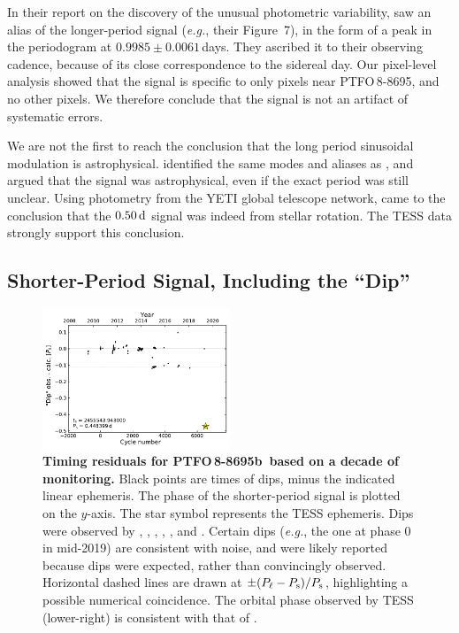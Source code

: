 \documentclass[12pt,twocolumn,tighten]{aastex62}
\newcommand{\ptfo}{PTFO$\,$8-8695}
\newcommand{\ptfob}{PTFO$\,$8-8695b}
\begin{document}
In their report on the discovery of the unusual photometric
variability, \citet{van_eyken_ptf_2012} saw an alias of the
longer-period signal ({\it e.g.}, their Figure~7), in the form of a
peak in the periodogram at $0.9985 \pm 0.0061\,$days. They ascribed it
to their observing cadence, because of its close correspondence to the
sidereal day.  Our pixel-level analysis showed that the signal is
specific to only pixels near \ptfo, and no other pixels.  We therefore
conclude that the signal is not an artifact of systematic errors.

We are not the first to reach the conclusion that the long period
sinusoidal modulation is astrophysical.  \citet{koen_multicolour_2015}
identified the same modes and aliases as \citet{van_eyken_ptf_2012},
and argued that the signal was astrophysical, even if the exact period
was still unclear.  Using photometry from the YETI global telescope
network, \citet{raetz_yeti_2016} came to the conclusion that the
$0.50\,{\rm d}$ signal was indeed from stellar rotation.  The TESS
data strongly support this conclusion.



\subsection{Shorter-Period Signal, Including the ``Dip''}

\begin{figure}[t]
	\begin{center}
		\leavevmode
		\includegraphics[width=0.5\textwidth]{f6.pdf}
	\end{center}
	\vspace{-0.7cm}
	\caption{
    {\bf Timing residuals for \ptfob\ based on a decade of
    monitoring.} Black points are times of dips, minus the indicated
    linear ephemeris.  The phase of the shorter-period signal is
    plotted on the $y$-axis. The star symbol represents the TESS
    ephemeris.  Dips were observed by \citet{van_eyken_ptf_2012},
    \citet{ciardi_followup_2015}, \citet{yu_tests_2015},
    \citet{raetz_yeti_2016}, \citet{onitsuka_multicolor_2017}, and
    \citet{tanimoto_evidence_2020}.  Certain dips ({\it e.g.}, the one
    at phase 0 in mid-2019) are consistent with noise, and were likely
    reported because dips were expected, rather than convincingly
    observed.  Horizontal dashed lines are drawn at $\pm (P_{\rm \ell}
    - P_{\rm s})/P_{\rm s}$, highlighting a possible numerical
    coincidence.  The orbital phase observed by TESS (lower-right) is
    consistent with that of \citet{tanimoto_evidence_2020}.
		\label{fig:o_minus_c}
	}
\end{figure}
\end{document}
